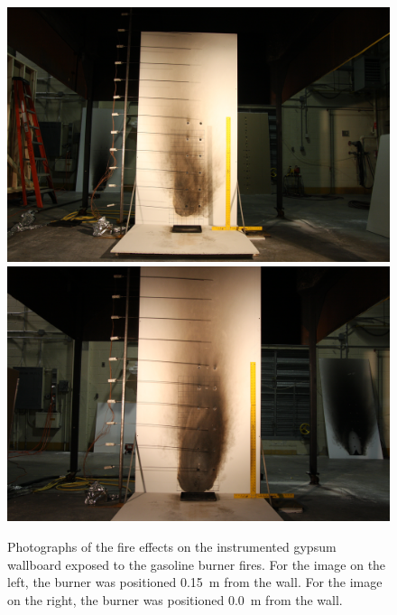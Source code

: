 \documentclass[twoside]{uocthesis}
\begin{document}
{\begin{figure}[p]
	\centering
	\includegraphics[trim=18.0in 4.0in 21.0in 14.0in, clip=true, width=0.4\columnwidth]{../Figures/IWGB_Gas_0_15_pattern}
	\includegraphics[trim=18.0in 2.6in 18.0in 11.7in, clip=true, width=0.4\columnwidth]{../Figures/IWGB_Gas7_0_8m} \\
	\caption[Photographs of the fire effects on the instrumented gypsum wallboard exposed to the gasoline burner fires]{Photographs of the fire effects on the instrumented gypsum wallboard exposed to the gasoline burner fires. For the image on the left, the burner was positioned 0.15~m from the wall.  For the image on the right, the burner was positioned 0.0~m from the wall.}
	\label{IWGB_Gas_patterns}
\end{figure}

}
\end{document}
